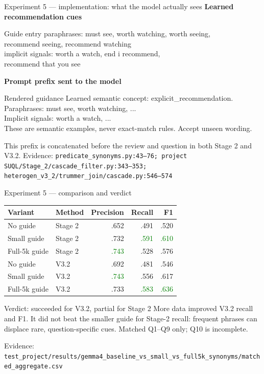 \documentclass[aspectratio=169,10pt]{beamer}
\newcommand{\yes}[1]{\textcolor{green}{#1}}\newcommand{\no}[1]{\textcolor{red}{#1}}\newcommand{\key}[1]{\textcolor{yellow}{#1}}
\newcommand{\citecode}[1]{\vfill{\color{soft}\tiny Evidence: \texttt{#1}}}
\begin{document}
\begin{frame}{Experiment 5 --- implementation: what the model actually sees}
\textbf{Learned recommendation cues}
\begin{block}{Guide entry}
\ttfamily\scriptsize paraphrases: must see, worth watching, worth seeing,\\
recommend seeing, recommend watching\\
implicit signals: worth a watch, end i recommend,\\
recommend that you see
\end{block}
\textbf{Prompt prefix sent to the model}
\begin{block}{Rendered guidance}
\ttfamily\scriptsize Learned semantic concept: explicit\_recommendation.\\
Paraphrases: must see, worth watching, ...\\
Implicit signals: worth a watch, ...\\
These are semantic examples, never exact-match rules. Accept unseen wording.
\end{block}
This prefix is concatenated before the review and question in both Stage 2 and V3.2.
\citecode{predicate\_synonyms.py:43--76; project SUQL/Stage\_2/cascade\_filter.py:343--353; heterogen\_v3\_2/trummer\_join/cascade.py:546--574}
\end{frame}

\begin{frame}{Experiment 5 --- comparison and verdict}
\centering\scriptsize
\begin{tabular}{llrrr}\toprule Variant & Method & Precision & Recall & F1\\\midrule
No guide & Stage 2 & .652 & .491 & .520\\
Small guide & Stage 2 & .732 & \yes{.591} & \yes{.610}\\
Full-5k guide & Stage 2 & \yes{.743} & .528 & .576\\\midrule
No guide & V3.2 & .692 & .481 & .546\\
Small guide & V3.2 & \yes{.743} & .556 & .617\\
Full-5k guide & V3.2 & .733 & \yes{.583} & \yes{.636}\\\bottomrule\end{tabular}
\vfill
\begin{block}{Verdict: succeeded for V3.2, partial for Stage 2}
More data improved V3.2 recall and F1. It did not beat the smaller guide for Stage-2 recall: frequent phrases can displace rare, question-specific cues. Matched Q1--Q9 only; Q10 is incomplete.
\end{block}
\citecode{test\_project/results/gemma4\_baseline\_vs\_small\_vs\_full5k\_synonyms/matched\_aggregate.csv}
\end{frame}
\end{document}
